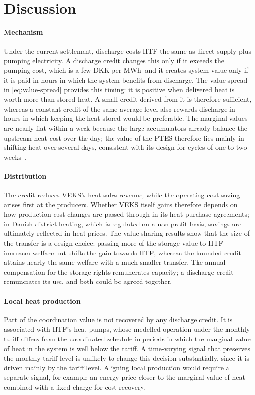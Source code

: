 \section{Discussion}
\label{sec:discussion}

\paragraph{Mechanism}
Under the current settlement, discharge costs HTF the same as direct supply plus pumping electricity. A discharge credit changes this only if it exceeds the pumping cost, which is a few DKK per MWh, and it creates system value only if it is paid in hours in which the system benefits from discharge. The value spread in \cref{eq:value-spread} provides this timing: it is positive when delivered heat is worth more than stored heat. A small credit derived from it is therefore sufficient, whereas a constant credit of the same average level also rewards discharge in hours in which keeping the heat stored would be preferable. The marginal values are nearly flat within a week because the large accumulators already balance the upstream heat cost over the day; the value of the PTES therefore lies mainly in shifting heat over several days, consistent with its design for cycles of one to two weeks~\cite{sifnaios2025performance}.

\paragraph{Distribution}
The credit reduces VEKS's heat sales revenue, while the operating cost saving arises first at the producers. Whether VEKS itself gains therefore depends on how production cost changes are passed through in its heat purchase agreements; in Danish district heating, which is regulated on a non-profit basis, savings are ultimately reflected in heat prices. The value-sharing results show that the size of the transfer is a design choice: passing more of the storage value to HTF increases welfare but shifts the gain towards HTF, whereas the bounded credit attains nearly the same welfare with a much smaller transfer. The annual compensation for the storage rights remunerates capacity; a discharge credit remunerates its use, and both could be agreed together.

\paragraph{Local heat production}
Part of the coordination value is not recovered by any discharge credit. It is associated with HTF's heat pumps, whose modelled operation under the monthly tariff differs from the coordinated schedule in periods in which the marginal value of heat in the system is well below the tariff. A time-varying signal that preserves the monthly tariff level is unlikely to change this decision substantially, since it is driven mainly by the tariff level. Aligning local production would require a separate signal, for example an energy price closer to the marginal value of heat combined with a fixed charge for cost recovery.

